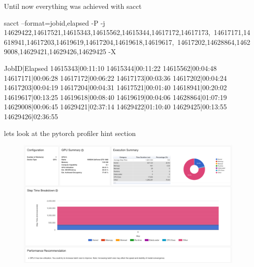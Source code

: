 \documentclass[compress,aspectratio=169]{beamer}
\begin{document}
\begin{frame}{Until now everything was achieved with sacct}

    \begin{listings}
sacct --format=jobid,elapsed -P -j 14629422,14617521,14615343,14615562,14615344,14617172,14617173,\
14617171,14618941,14617203,14619619,14617204,14619618,14619617,\
14617202,14628864,14629008,14629421,14629426,14629425 -X


    JobID|Elapsed
14615343|00:11:10
14615344|00:11:22
14615562|00:04:48
14617171|00:06:28
14617172|00:06:22
14617173|00:03:36
14617202|00:04:24
14617203|00:04:19
14617204|00:04:31
14617521|00:01:40
14618941|00:20:02
14619617|00:13:25
14619618|00:08:40
14619619|00:04:06
14628864|01:07:19
14629008|00:06:45
14629421|02:37:14
14629422|01:10:40
14629425|00:13:55
14629426|02:36:55
\end{listings}

\end{frame}


\begin{frame}{lets look at the pytorch profiler hint section}

\begin{center}
    \begin{figure}
        \includegraphics[width=1\textwidth]{../../data/scap_gtx1080_profiler-torch_14615562}
    \end{figure}
\end{center}

\end{frame}
\end{document}
